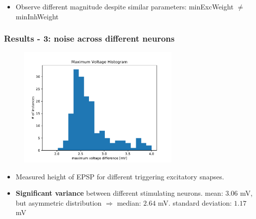 \documentclass{beamer}
\begin{document}
\begin{frame}
\begin{columns}

	\end{columns}
	
	\begin{itemize}
		\item Observe different magnitude despite similar parameters: minExcWeight 
		$\neq$ minInhWeight
	\end{itemize}
\end{frame}

\begin{frame}
	\frametitle{Results - 3: noise across different neurons}
	
	\begin{figure}
		\includegraphics[width=0.7\textwidth]{figures/histo_maxVolt.pdf}
	\end{figure}
	
	\begin{itemize}
		\item Measured height of EPSP for different triggering excitatory snapses. 
		 \item \textbf{Significant variance} between different stimulating neurons. 
		  mean: $3.06$ mV,  but asymmetric distribution $\Rightarrow$ median: $2.64$ mV.
		 standard deviation: $1.17$ mV
	\end{itemize}
\end{frame}
\end{document}
